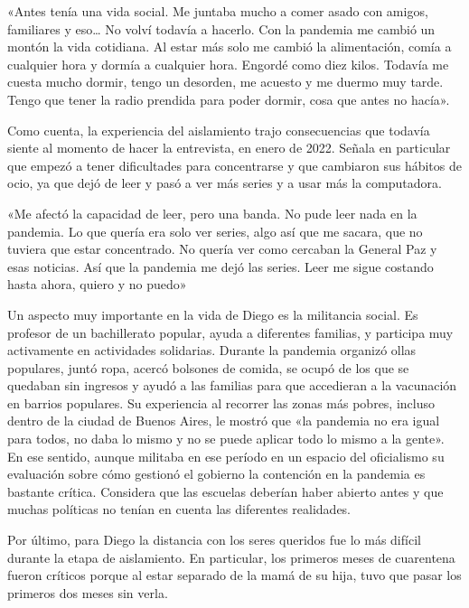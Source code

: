\begin{refsection}
\begin{gbcita}
«Antes tenía una vida social. Me juntaba mucho a comer asado con amigos, familiares y eso… No volví todavía a hacerlo. Con la pandemia me cambió un montón la vida cotidiana. Al estar más solo me cambió la alimentación, comía a cualquier hora y dormía a cualquier hora. Engordé como diez kilos. Todavía me cuesta mucho dormir, tengo un desorden, me acuesto y me duermo muy tarde. Tengo que tener la radio prendida para poder dormir, cosa que antes no hacía».

\end{gbcita}

Como cuenta, la experiencia del aislamiento trajo consecuencias que todavía siente al momento de hacer la entrevista, en enero de 2022. Señala en particular que empezó a tener dificultades para concentrarse y que cambiaron sus hábitos de ocio, ya que dejó de leer y pasó a ver más series y a usar más la computadora.


\begin{gbcita}
«Me afectó la capacidad de leer, pero una banda. No pude leer nada en la pandemia. Lo que quería era solo ver series, algo así que me sacara, que no tuviera que estar concentrado. No quería ver como cercaban la General Paz y esas noticias. Así que la pandemia me dejó las series. Leer me sigue costando hasta ahora, quiero y no puedo»

\end{gbcita}

Un aspecto muy importante en la vida de Diego es la militancia social. Es profesor de un bachillerato popular, ayuda a diferentes familias, y participa muy activamente en actividades solidarias. Durante la pandemia organizó ollas populares, juntó ropa, acercó bolsones de comida, se ocupó de los que se quedaban sin ingresos y ayudó a las familias para que accedieran a la vacunación en barrios populares. Su experiencia al recorrer las zonas más pobres, incluso dentro de la ciudad de Buenos Aires, le mostró que «la pandemia no era igual para todos, no daba lo mismo y no se puede aplicar todo lo mismo a la gente». En ese sentido, aunque militaba en ese período en un espacio del oficialismo su evaluación sobre cómo gestionó el gobierno la contención en la pandemia es bastante crítica. Considera que las escuelas deberían haber abierto antes y que muchas políticas no tenían en cuenta las diferentes realidades.

Por último, para Diego la distancia con los seres queridos fue lo más difícil durante la etapa de aislamiento. En particular, los primeros meses de cuarentena fueron críticos porque al estar separado de la mamá de su hija, tuvo que pasar los primeros dos meses sin verla.



\end{refsection}
